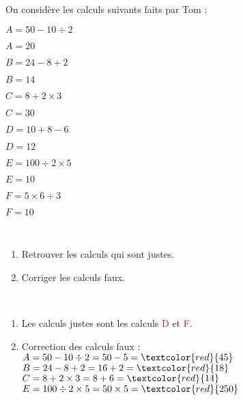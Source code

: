 \begin{exercice} %
   On considère les calculs suivants faits par Tom :
   \setlength{\columnseprule}{0pt}
   \begin{multicols}{2}
      \begin{list}{}{}
         \item $A=50-10\div2$
         \item $A=20$
         
         \smallskip         
         \item $B=24-8+2$
         \item $B=14$

         \smallskip
         \item $C=8+2\times3$
         \item $C=30$
         \columnbreak
         \item $D=10+8-6$
         \item $D=12$
         
         \smallskip
         \item $E=100\div2\times5$
         \item $E=10$
         
         \smallskip
         \item $F=5\times6\div3$
         \item $F=10$
      \end{list}
   \end{multicols}
   \  \\ [-10mm]
   \begin{enumerate}
      \item Retrouver les calculs qui sont justes.
      \item Corriger les calculs faux.
   \end{enumerate}
\end{exercice}

\begin{corrige}
   \ \\ [-5mm]
   \begin{enumerate}
      \item Les calculs justes sont les calculs \textcolor{red}{D} et \textcolor{red}{F}. \smallskip
      \item Correction des calculs faux : \\
         $A=50-10\div2 =50-5 =\textcolor{red}{45}$ \\ [1mm]
         $B=24-8+2 =16+2 =\textcolor{red}{18}$ \\ [1mm]
         $C=8+2\times3 =8+6 =\textcolor{red}{14}$ \\ [1mm]
         $E=100\div2\times5 =50\times5 = \textcolor{red}{250}$
   \end{enumerate}
\end{corrige}